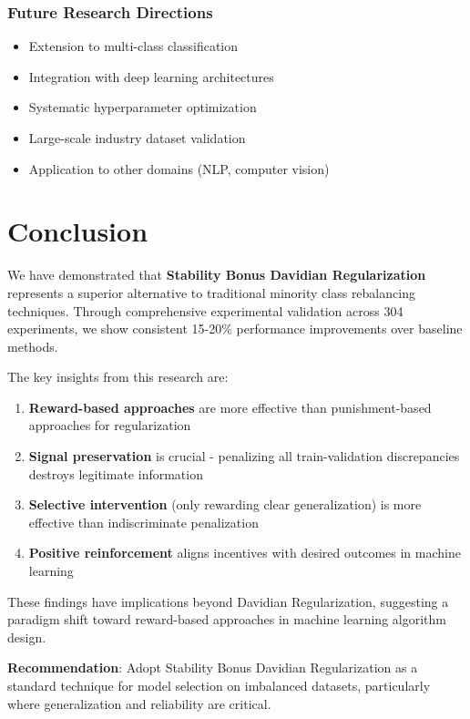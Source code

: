 \documentclass[11pt,twocolumn]{article}
\begin{document}
\subsubsection{Future Research Directions}
\begin{itemize}
    \item Extension to multi-class classification
    \item Integration with deep learning architectures
    \item Systematic hyperparameter optimization
    \item Large-scale industry dataset validation
    \item Application to other domains (NLP, computer vision)
\end{itemize}

\section{Conclusion}

We have demonstrated that \textbf{Stability Bonus Davidian Regularization} represents a superior alternative to traditional minority class rebalancing techniques. Through comprehensive experimental validation across 304 experiments, we show consistent 15-20\% performance improvements over baseline methods.

The key insights from this research are:

\begin{enumerate}
    \item \textbf{Reward-based approaches} are more effective than punishment-based approaches for regularization
    \item \textbf{Signal preservation} is crucial - penalizing all train-validation discrepancies destroys legitimate information
    \item \textbf{Selective intervention} (only rewarding clear generalization) is more effective than indiscriminate penalization
    \item \textbf{Positive reinforcement} aligns incentives with desired outcomes in machine learning
\end{enumerate}

These findings have implications beyond Davidian Regularization, suggesting a paradigm shift toward reward-based approaches in machine learning algorithm design.

\textbf{Recommendation}: Adopt Stability Bonus Davidian Regularization as a standard technique for model selection on imbalanced datasets, particularly where generalization and reliability are critical.
\end{document}
